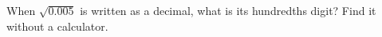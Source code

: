When $\sqrt{0.005}$ is written as a decimal, what is its hundredths digit? Find it without a calculator.
